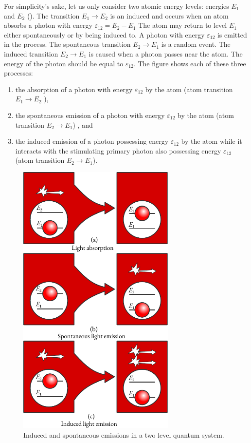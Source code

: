 For simplicity's sake, let us only consider two atomic energy levels:
energies $E_{1}$ and $E_{2}$ (). The transition $E_{1} \to E_{2}$ is an induced and occurs when an atom absorbs a photon with energy $\varepsilon_{12} = E_{2} - E_{1}$ The atom may return to level $E_{1}$ either spontaneously or by being induced to. A photon with energy $\varepsilon_{12}$ is emitted in the process. The spontaneous transition $E_{2} \to E_{1}$ is a random event. The induced transition $E_{2} \to E_{1}$ is caused when a photon passes near the atom. The energy of the photon should be equal to $\varepsilon_{12}$. The figure shows each of these three processes: 

\begin{enumerate}[label=(\alph*),noitemsep,nolistsep]
\item the absorption of a photon with energy $\varepsilon_{12}$ by the atom (atom transition  $E_{1} \to E_{2}$ ), 
\item the spontaneous emission of a photon with energy $\varepsilon_{12}$ by the atom (atom transition $E_{2} \to E_{1}$) , and
\item the induced emission of a photon possessing energy $\varepsilon_{12}$ by the atom while it interacts with the stimulating primary photon also possessing energy $\varepsilon_{12}$ (atom transition $E_{2} \to E_{1}$).
\end{enumerate}

\begin{figure}[!ht]
\centering
\includegraphics[width=0.7\textwidth]{figures/emission.pdf}
\caption{Induced and spontaneous emissions in a two level quantum system.\label{emission}}
\end{figure}


